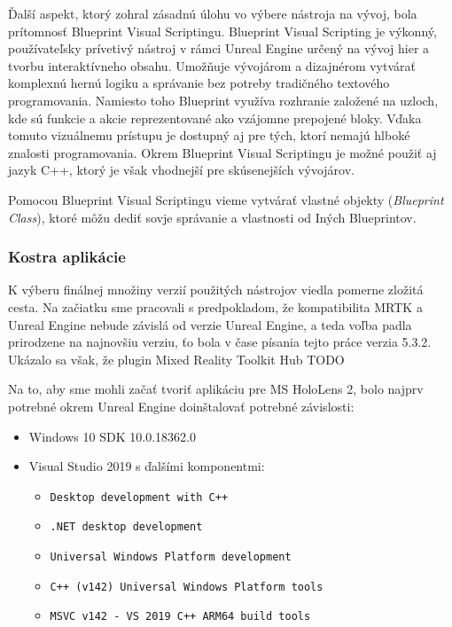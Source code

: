 Ďalší aspekt, ktorý zohral zásadnú úlohu vo výbere nástroja na vývoj, bola prítomnosť Blueprint Visual Scriptingu. Blueprint Visual Scripting je výkonný, používateľsky prívetivý nástroj v rámci 
Unreal Engine určený na vývoj hier a tvorbu interaktívneho obsahu. Umožňuje vývojárom a dizajnérom vytvárať komplexnú hernú logiku a správanie bez potreby tradičného textového programovania. Namiesto toho 
Blueprint využíva rozhranie založené na uzloch, kde sú funkcie a akcie reprezentované ako vzájomne prepojené bloky. Vďaka tomuto vizuálnemu prístupu je dostupný aj pre tých, ktorí nemajú hlboké znalosti programovania.
Okrem Blueprint Visual Scriptingu je možné použiť aj jazyk C++, ktorý je však vhodnejší pre skúsenejších vývojárov.

Pomocou Blueprint Visual Scriptingu vieme vytvárať vlastné objekty (\emph{Blueprint Class}), ktoré môžu dediť sovje správanie a vlastnosti od Iných Blueprintov.

\subsubsection{Kostra aplikácie}
K výberu finálnej množiny verzií použitých nástrojov viedla pomerne zložitá cesta. Na začiatku sme pracovali s predpokladom, že kompatibilita MRTK a Unreal Engine nebude závislá od verzie Unreal
Engine, a teda voľba padla prirodzene na najnovšiu verziu, ťo bola v čase písania tejto práce verzia 5.3.2. Ukázalo sa však, že plugin Mixed Reality Toolkit Hub TODO

Na to, aby sme mohli začať tvoriť aplikáciu pre MS HoloLens 2, bolo najprv potrebné okrem Unreal Engine doinštalovať potrebné závislosti:
\begin{itemize}
  \item Windows 10 SDK 10.0.18362.0
  \item Visual Studio 2019 s ďalšími komponentmi:
  \begin{itemize}    
    \item \texttt{Desktop development with C++}
    \item \texttt{.NET desktop development}
    \item \texttt{Universal Windows Platform development}
    \item \texttt{C++ (v142) Universal Windows Platform tools}
    \item \texttt{MSVC v142 - VS 2019 C++ ARM64 build tools}    
  \end{itemize}
\end{itemize}


